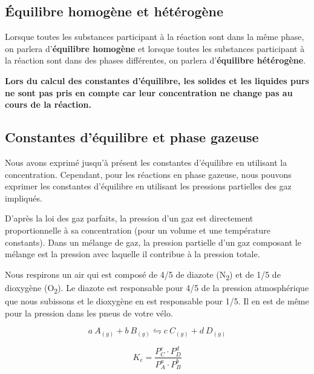 \documentclass[
  11pt,
  french,
  a4paper,
  openany]{book}
\begin{document}
\hypertarget{uxe9quilibre-homoguxe8ne-et-huxe9tuxe9roguxe8ne}{%
\subsection{Équilibre homogène et hétérogène}\label{uxe9quilibre-homoguxe8ne-et-huxe9tuxe9roguxe8ne}}

Lorsque toutes les substances participant à la réaction sont dans la même phase, on parlera d'\textbf{équilibre homogène} et lorsque toutes les substances participant à la réaction sont dans des phases différentes, on parlera d'\textbf{équilibre hétérogène}.

\textbf{Lors du calcul des constantes d'équilibre, les solides et les liquides purs ne sont pas pris en compte car leur concentration ne change pas au cours de la réaction.}

\hypertarget{constantes-duxe9quilibre-et-phase-gazeuse}{%
\subsection{Constantes d'équilibre et phase gazeuse}\label{constantes-duxe9quilibre-et-phase-gazeuse}}

Nous avons exprimé jusqu'à présent les constantes d'équilibre en utilisant la concentration. Cependant, pour les réactions en phase gazeuse, nous pouvons exprimer les constantes d'équilibre en utilisant les pressions partielles des gaz impliqués.

D'après la loi des gaz parfaits, la pression d'un gaz est directement proportionnelle à sa concentration (pour un volume et une température constants). Dans un mélange de gaz, la pression partielle d'un gaz composant le mélange est la pression avec laquelle il contribue à la pression totale.

Nous respirons un air qui est composé de 4/5 de diazote (N\textsubscript{2}) et de 1/5 de dioxygène (O\textsubscript{2}). Le diazote est responsable pour 4/5 de la pression atmosphérique que nous subissons et le dioxygène en est responsable pour 1/5. Il en est de même pour la pression dans les pneus de votre vélo.

\[
  a\ A_{(g)} + b\ B_{(g)} \leftrightharpoons c\ C_{(g)} + d\ D_{(g)}
\]

\[
  K_{e} = \frac{P_C^{c} \cdot P_D^{d}}{P_A^{a} \cdot P_B^{b}}
\]
\end{document}
